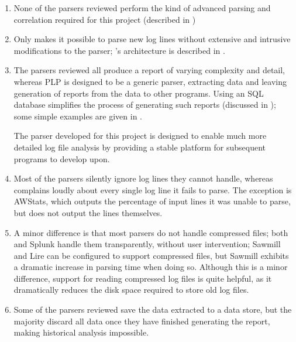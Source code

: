 \begin{enumerate}

    \item None of the parsers reviewed perform the kind of advanced parsing
        and correlation required for this project (described in
        )

    \item Only \parsername{} makes it possible to parse new log lines
        without extensive and intrusive modifications to the parser;
        \parsername{}'s architecture is described in .

    \item The parsers reviewed all produce a report of varying complexity
        and detail, whereas \gls{PLP} is designed to be a generic parser,
        extracting data and leaving generation of reports from the data to
        other programs.  Using an \gls{SQL} database simplifies the process
        of generating such reports (discussed in ); some simple examples are given in .

        The parser developed for this project is designed to enable much
        more detailed log file analysis by providing a stable platform for
        subsequent programs to develop upon.

    \item Most of the parsers silently ignore log lines they cannot handle,
        whereas \parsername{} complains loudly about every single log line
        it fails to parse.  The exception is AWStats, which outputs the
        percentage of input lines it was unable to parse, but does not
        output the lines themselves.

    \item A minor difference is that most parsers do not handle compressed
        files; both \parsername{} and Splunk handle them transparently,
        without user intervention; Sawmill and Lire can be configured to
        support compressed files, but Sawmill exhibits a dramatic increase
        in parsing time when doing so.  Although this is a minor
        difference, support for reading compressed log files is quite
        helpful, as it dramatically reduces the disk space required to
        store old log files.

    \item Some of the parsers reviewed save the data extracted to a data
        store, but the majority discard all data once they have finished
        generating the report, making historical analysis impossible.

\end{enumerate}

